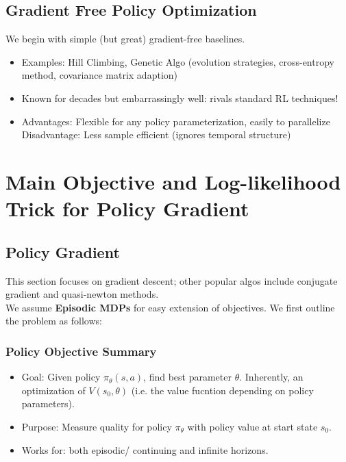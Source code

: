 \documentclass{article}
\begin{document}
\subsection{Gradient Free Policy Optimization}
We begin with simple (but great) gradient-free baselines.
\begin{itemize}
\item Examples: Hill Climbing, Genetic Algo (evolution strategies, cross-entropy method, covariance matrix adaption)
\item Known for decades but embarrassingly well: rivals standard RL techniques!
\item Advantages: Flexible for any policy parameterization, easily to parallelize
    \\Disadvantage: Less sample efficient (ignores temporal structure)
\end{itemize}

\section{Main Objective and Log-likelihood Trick for Policy Gradient}

\subsection{Policy Gradient}
This section focuses on gradient descent; other popular algos include conjugate gradient and quasi-newton methods.
\\We assume \textbf{Episodic MDPs} for easy extension of objectives. We first outline the problem as follows:

\begin{defbox}
    \subsubsection*{Policy Objective Summary}
    \begin{itemize}
    \item Goal: Given policy $\pi_{\theta}(s, a)$, find best parameter $\theta$.
        Inherently, an optimization of $V(s_0, \theta)$ (i.e. the value fucntion depending on policy parameters).
    \item Purpose: Measure quality for policy $\pi_{\theta}$ with policy value at start state $s_0$.
    \item Works for: both episodic/ continuing and infinite horizons.
    \end{itemize}
\end{defbox}
\end{document}
